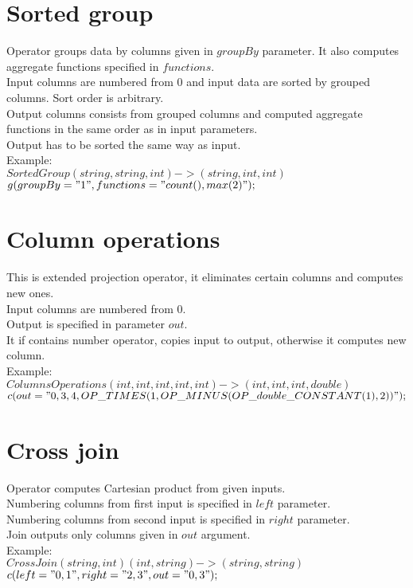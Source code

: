 \documentclass{article}
\begin{document}
\section{Sorted group}
Operator groups data by columns given in $groupBy$ parameter.
It also computes aggregate functions specified in $functions$.\\
Input columns are numbered from 0 and input data are sorted by grouped columns. Sort order is arbitrary.\\
Output columns consists from grouped columns and computed aggregate functions in the same order as in input parameters.\\
Output has to be sorted the same way as input.\\
Example: \\  
$SortedGroup(string,string,int)->(string,int,int)$ \\
$g(groupBy="1",functions="count(),max(2)");$ \\

\section{Column operations}
This is extended projection operator, it eliminates certain columns and computes new ones.\\
Input columns are numbered from 0.\\
Output is specified in parameter $out$.\\
 It if contains number operator, copies input to output, otherwise it computes new column.\\
Example: \\  
$ColumnsOperations(int,int,int,int,int)->(int,int,int,double)$ \\
$c(out="0,3,4,OP\_TIMES(1,OP\_MINUS(OP\_double\_CONSTANT(1),2))");$\\ 


\section{Cross join}
Operator computes Cartesian product from given inputs.\\
Numbering columns from first input is specified in $left$ parameter.\\
Numbering columns from second input is specified in $right$ parameter.\\
Join outputs only columns given in $out$ argument.\\
Example:\\
$CrossJoin(string,int)(int,string)->(string,string)$\\
$c(left="0,1",right="2,3",out="0,3");$\\
\end{document}
